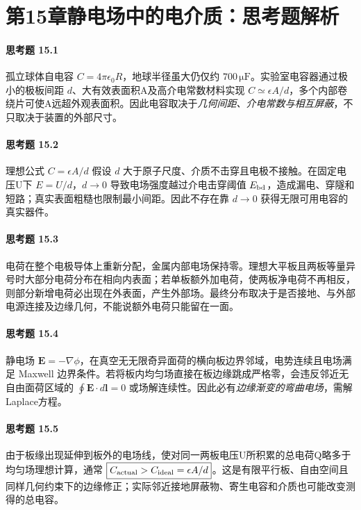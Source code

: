 \section*{第15章\quad 静电场中的电介质：思考题解析}
\paragraph{思考题 15.1}
孤立球体自电容 \(C=4\pi\epsilon_0 R\)，地球半径虽大仍仅约 \(700\,\mathrm{\mu F}\)。实验室电容器通过极小的极板间距 \(d\)、大有效表面积A及高介电常数材料实现 \(C\simeq\epsilon A/d\)，多个内部卷绕片可使A远超外观表面积。因此电容取决于\emph{几何间距、介电常数与相互屏蔽}，不只取决于装置的外部尺寸。

\paragraph{思考题 15.2}
理想公式 \(C=\epsilon A/d\) 假设 \(d\) 大于原子尺度、介质不击穿且电极不接触。在固定电压U下 \(E=U/d\)，\(d\to0\) 导致电场强度越过介电击穿阈值 \(E_{\rm bd}\)，造成漏电、穿隧和短路；真实表面粗糙也限制最小间距。因此不存在靠 \(d\to0\) 获得无限可用电容的真实器件。

\paragraph{思考题 15.3}
电荷在整个电极导体上重新分配，金属内部电场保持零。理想大平板且两板等量异号时大部分电荷分布在相向内表面；若单板额外加电荷，使两板净电荷不再相反，则部分新增电荷必出现在外表面，产生外部场。最终分布取决于是否接地、与外部电源连接及边缘几何，不能说额外电荷只能留在一面。

\paragraph{思考题 15.4}
静电场 \(\boldsymbol E=-\nabla\phi\)，在真空无无限奇异面荷的横向板边界邻域，电势连续且电场满足 Maxwell 边界条件。若将板内均匀场直接在板边缘跳成严格零，会违反邻近无自由面荷区域的 \(\oint\boldsymbol E\cdot d\boldsymbol l=0\) 或场解连续性。因此必有\emph{边缘渐变的弯曲电场}，需解Laplace方程。

\paragraph{思考题 15.5}
由于板缘出现延伸到板外的电场线，使对同一两板电压U所积累的总电荷Q略多于均匀场理想计算，通常 \(\boxed{C_{\rm actual}>C_{\rm ideal}=\epsilon A/d}\)。这是有限平行板、自由空间且同样几何约束下的边缘修正；实际邻近接地屏蔽物、寄生电容和介质也可能改变测得的总电容。

